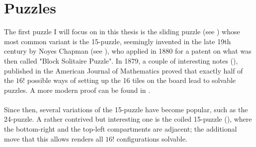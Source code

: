 
\chapter{Puzzles} %

\label{sec:Puzzles} %





The first puzzle I will focus on in this thesis is the sliding puzzle (see \cite{SlidingPuzzleWiki}) whose most common variant is the 15-puzzle, seemingly invented in the late 19th century by Noyes Chapman (see \cite{SlidingPuzzleWolfram}), who applied in 1880 for a patent on what was then called "Block Solitaire Puzzle". In 1879, a couple of interesting notes (\cite{Johnson1879}), published in the American Journal of Mathematics proved that exactly half of the $16!$ possible ways of setting up the 16 tiles on the board lead to solvable puzzles. A more modern proof can be found in \cite{Archer1999}.
\\
\\
Since then, several variations of the 15-puzzle have become popular, such as the 24-puzzle. A rather contrived but interesting one is the coiled 15-puzzle (\cite{Coiled15Puzzle}), where the bottom-right and the top-left compartments are adjacent; the additional move that this allows renders all $16!$ configurations solvable. 



